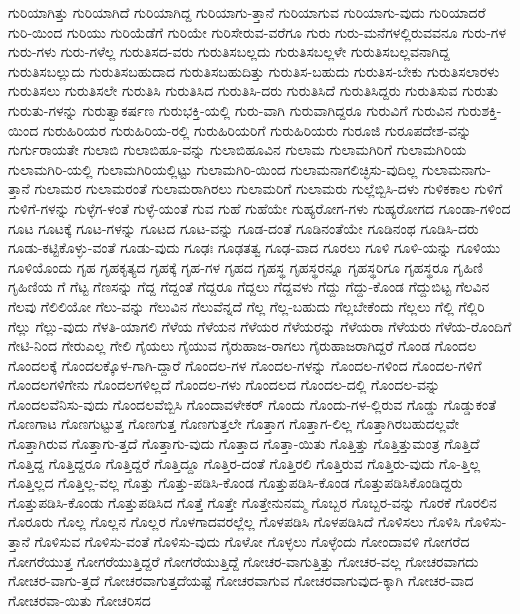 {ಗುರಿಯಾಗಿತ್ತು
ಗುರಿಯಾಗಿದೆ
ಗುರಿಯಾಗಿದ್ದ
ಗುರಿಯಾಗು-ತ್ತಾನೆ
ಗುರಿಯಾಗುವ
ಗುರಿಯಾಗು-ವುದು
ಗುರಿಯಾದರೆ
ಗುರಿ-ಯಿಂದ
ಗುರಿಯು
ಗುರಿಯೆಡೆಗೆ
ಗುರಿಯೇ
ಗುರಿಸೇರುವ-ವರೆಗೂ
ಗುರು
ಗುರು-ಮನೆಗಳಲ್ಲಿರುವವನೂ
ಗುರು-ಗಳ
ಗುರು-ಗಳು
ಗುರು-ಗಳೆಲ್ಲ
ಗುರುತಿಸದ-ವರು
ಗುರುತಿಸಬಲ್ಲದು
ಗುರುತಿಸಬಲ್ಲಳೇ
ಗುರುತಿಸಬಲ್ಲವನಾಗಿದ್ದ
ಗುರುತಿಸಬಲ್ಲುದು
ಗುರುತಿಸಬಹುದಾದ
ಗುರುತಿಸಬಹುದಿತ್ತು
ಗುರುತಿಸ-ಬಹುದು
ಗುರುತಿಸ-ಬೇಕು
ಗುರುತಿಸಲಾರಳು
ಗುರುತಿಸಲು
ಗುರುತಿಸಲೇ
ಗುರುತಿಸಿ
ಗುರುತಿಸಿದ
ಗುರುತಿಸಿ-ದರು
ಗುರುತಿಸಿದೆ
ಗುರುತಿಸಿದ್ದರು
ಗುರುತಿಸುವ
ಗುರುತು
ಗುರುತು-ಗಳನ್ನು
ಗುರುತ್ವಾಕರ್ಷಣ
ಗುರುಭಕ್ತಿ-ಯಲ್ಲಿ
ಗುರು-ವಾಗಿ
ಗುರುವಾಗಿದ್ದರೂ
ಗುರುವಿಗೆ
ಗುರುವಿನ
ಗುರುಶಕ್ತಿ-ಯಿಂದ
ಗುರುಹಿರಿಯರ
ಗುರುಹಿರಿಯ-ರಲ್ಲಿ
ಗುರುಹಿರಿಯರಿಗೆ
ಗುರುಹಿರಿಯರು
ಗುರೂಜಿ
ಗುರೂಪದೇಶ-ವನ್ನು
ಗುರ್ಗುರಾಯತೇ
ಗುಲಾಬಿ
ಗುಲಾಬಿಹೂ-ವನ್ನು
ಗುಲಾಬಿಹೂವಿನ
ಗುಲಾಮ
ಗುಲಾಮಗಿರಿಗೆ
ಗುಲಾಮಗಿರಿಯ
ಗುಲಾಮಗಿರಿ-ಯಲ್ಲಿ
ಗುಲಾಮಗಿರಿಯಲ್ಲಿಟ್ಟು
ಗುಲಾಮಗಿರಿ-ಯಿಂದ
ಗುಲಾಮನಾಗಲಿಚ್ಛಿಸು-ವುದಿಲ್ಲ
ಗುಲಾಮನಾಗು-ತ್ತಾನೆ
ಗುಲಾಮರ
ಗುಲಾಮರಂತೆ
ಗುಲಾಮರಾಗಿರಲು
ಗುಲಾಮರಿಗೆ
ಗುಲಾಮರು
ಗುಲ್ಲೆಬ್ಬಿಸಿ-ದಳು
ಗುಳಿಕಕಾಲ
ಗುಳಿಗೆ
ಗುಳಿಗೆ-ಗಳನ್ನು
ಗುಳ್ಳೆಗ-ಳಂತೆ
ಗುಳ್ಳೆ-ಯಂತೆ
ಗುವ
ಗುಹೆ
ಗುಹೆಯೇ
ಗುಹ್ಯರೋಗ-ಗಳು
ಗುಹ್ಯರೋಗದ
ಗೂಂಡಾ-ಗಳಿಂದ
ಗೂಟ
ಗೂಟಕ್ಕೆ
ಗೂಟ-ಗಳನ್ನು
ಗೂಟದ
ಗೂಟ-ವನ್ನು
ಗೂಡ-ದಂತೆ
ಗೂಡಿನಂತೆಯೇ
ಗೂಡಿನಂಥ
ಗೂಡಿಸಿ-ದರು
ಗೂಡು-ಕಟ್ಟಿಕೊಳ್ಳು-ವಂತೆ
ಗೂಡು-ವುದು
ಗೂಢಃ
ಗೂಢತತ್ವ
ಗೂಢ-ವಾದ
ಗೂರಲು
ಗೂಳಿ
ಗೂಳಿ-ಯನ್ನು
ಗೂಳಿಯು
ಗೂಳಿಯೊಂದು
ಗೃಹ
ಗೃಹಕೃತ್ಯದ
ಗೃಹಕ್ಕೆ
ಗೃಹ-ಗಳ
ಗೃಹದ
ಗೃಹಸ್ಥ
ಗೃಹಸ್ಥರನ್ನೂ
ಗೃಹಸ್ಥರಿಗೂ
ಗೃಹಸ್ಥರೂ
ಗೃಹಿಣಿ
ಗೃಹಿಣಿಯ
ಗೆ
ಗೆಟ್ಟ
ಗೆಣಸನ್ನು
ಗೆದ್ದ
ಗೆದ್ದಂತೆ
ಗೆದ್ದರೂ
ಗೆದ್ದಲು
ಗೆದ್ದವಳು
ಗೆದ್ದು
ಗೆದ್ದು-ಕೊಂಡ
ಗೆದ್ದುಬಿಟ್ಟ
ಗೆಲವಿನ
ಗೆಲವು
ಗೆಲಿಲಿಯೋ
ಗೆಲು-ವನ್ನು
ಗೆಲುವಿನ
ಗೆಲುವೆನ್ನದೆ
ಗೆಲ್ಲ
ಗೆಲ್ಲ-ಬಹುದು
ಗೆಲ್ಲಬೇಕೆಂದು
ಗೆಲ್ಲಲು
ಗೆಲ್ಲಿ
ಗೆಲ್ಲಿರಿ
ಗೆಲ್ಲು
ಗೆಲ್ಲು-ವುದು
ಗೆಳತಿ-ಯಾಗಲಿ
ಗೆಳೆಯ
ಗೆಳೆಯನ
ಗೆಳೆಯರ
ಗೆಳೆಯರನ್ನು
ಗೆಳೆಯರಾ
ಗೆಳೆಯರು
ಗೆಳೆಯ-ರೊಂದಿಗೆ
ಗೇಟಿ-ನಿಂದ
ಗೇರುಎಲ್ಲ
ಗೇಲಿ
ಗೈಯಲು
ಗೈಯುವ
ಗೈರುಹಾಜ-ರಾಗಲು
ಗೈರುಹಾಜರಾಗಿದ್ದರೆ
ಗೊಂಡ
ಗೊಂದಲ
ಗೊಂದಲಕ್ಕೆ
ಗೊಂದಲಕ್ಕೊಳ-ಗಾಗಿ-ದ್ದಾರೆ
ಗೊಂದಲ-ಗಳ
ಗೊಂದಲ-ಗಳನ್ನು
ಗೊಂದಲ-ಗಳಿಂದ
ಗೊಂದಲ-ಗಳಿಗೆ
ಗೊಂದಲಗಳಿಗೇನು
ಗೊಂದಲಗಳಿಲ್ಲದೆ
ಗೊಂದಲ-ಗಳು
ಗೊಂದಲದ
ಗೊಂದಲ-ದಲ್ಲಿ
ಗೊಂದಲ-ವನ್ನು
ಗೊಂದಲವೆನಿಸು-ವುದು
ಗೊಂದಲವೆಬ್ಬಿಸಿ
ಗೊಂದಾವಳೇಕರ್
ಗೊಂದು
ಗೊಂದು-ಗಳ-ಲ್ಲಿರುವ
ಗೊಡ್ಡು
ಗೊಡ್ಡುಕಂತೆ
ಗೊಣಗಾಟ
ಗೊಣಗುಟ್ಟುತ್ತ
ಗೊಣಗುತ್ತ
ಗೊಣಗುತ್ತಲೇ
ಗೊತ್ತಾಗ
ಗೊತ್ತಾಗ-ಲಿಲ್ಲ
ಗೊತ್ತಾಗಿರಬಹುದಲ್ಲವೇ
ಗೊತ್ತಾಗಿರುವ
ಗೊತ್ತಾಗು-ತ್ತದೆ
ಗೊತ್ತಾಗು-ವುದು
ಗೊತ್ತಾದ
ಗೊತ್ತಾ-ಯಿತು
ಗೊತ್ತಿತ್ತು
ಗೊತ್ತಿತ್ತುಮಂತ್ರ
ಗೊತ್ತಿದೆ
ಗೊತ್ತಿದ್ದ
ಗೊತ್ತಿದ್ದರೂ
ಗೊತ್ತಿದ್ದರೆ
ಗೊತ್ತಿದ್ದೂ
ಗೊತ್ತಿರ-ದಂತೆ
ಗೊತ್ತಿರಲಿ
ಗೊತ್ತಿರುವ
ಗೊತ್ತಿರು-ವುದು
ಗೊ-ತ್ತಿಲ್ಲ
ಗೊತ್ತಿಲ್ಲದ
ಗೊತ್ತಿಲ್ಲ-ವಲ್ಲ
ಗೊತ್ತು
ಗೊತ್ತು-ಪಡಿಸಿ-ಕೊಂಡ
ಗೊತ್ತುಪಡಿಸಿ-ಕೊಂಡ
ಗೊತ್ತುಪಡಿಸಿಕೊಂಡಿದ್ದರು
ಗೊತ್ತುಪಡಿಸಿ-ಕೊಂಡು
ಗೊತ್ತುಪಡಿಸಿದ
ಗೊತ್ತೆ
ಗೊತ್ತೇ
ಗೊತ್ತೇನುನಮ್ಮ
ಗೊಬ್ಬರ
ಗೊಬ್ಬರ-ವನ್ನು
ಗೊರಕೆ
ಗೊರಲಿನ
ಗೊರೂರು
ಗೊಲ್ಲ
ಗೊಲ್ಲನ
ಗೊಲ್ಲರ
ಗೊಳಗಾದವರಲ್ಲೆಲ್ಲ
ಗೊಳಪಡಿಸಿ
ಗೊಳಪಡಿಸಿದೆ
ಗೊಳಿಸಲು
ಗೊಳಿಸಿ
ಗೊಳಿಸು-ತ್ತಾನೆ
ಗೊಳಿಸುವ
ಗೊಳಿಸು-ವಂತೆ
ಗೊಳಿಸು-ವುದು
ಗೊಳೋ
ಗೊಳ್ಳಲು
ಗೊಳ್ಳೆಂದು
ಗೋಂದಾವಳಿ
ಗೋಗರೆದ
ಗೋಗರೆಯುತ್ತ
ಗೋಗರೆಯುತ್ತಿದ್ದರೆ
ಗೋಗರೆಯುತ್ತಿದ್ದೆ
ಗೋಚರ-ವಾಗುತ್ತಿತ್ತು
ಗೋಚರ-ವಲ್ಲ
ಗೋಚರವಾಗದು
ಗೋಚರ-ವಾಗು-ತ್ತದೆ
ಗೋಚರವಾಗುತ್ತದೆಯಷ್ಟೆ
ಗೋಚರವಾಗುವ
ಗೋಚರವಾಗುವುದ-ಕ್ಕಾಗಿ
ಗೋಚರ-ವಾದ
ಗೋಚರವಾ-ಯಿತು
ಗೋಚರಿಸದ
}

